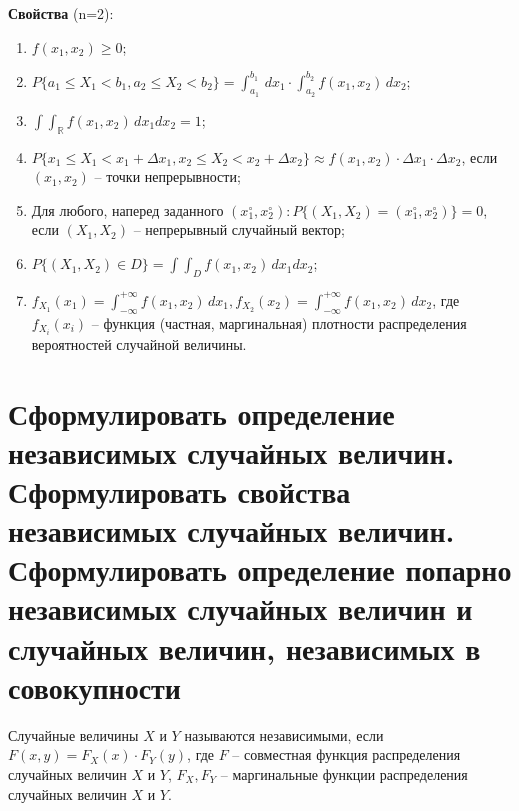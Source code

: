 \textbf{Свойства} (n=2):
\begin{enumerate}
	\item $f(x_1, x_2) \geq 0$;
	\item $P\{a_1 \leq X_1 < b_1, a_2 \leq X_2 < b_2\} = \int_{a_1}^{b_1} \, dx_1 \cdot \int_{a_2}^{b_2} f(x_1, x_2)\, dx_2$;
	\item $\int \int_{\mathbb{R}} f(x_1, x_2)\, dx_1dx_2 = 1$;
	\item $P\{x_1 \leq X_1 < x_1 + \Delta x_1, x_2 \leq X_2 < x_2 + \Delta x_2\} \approx f(x_1, x_2) \cdot \Delta x_1 \cdot \Delta x_2$, если $(x_1, x_2)$ -- точки непрерывности;
	\item Для любого, наперед заданного $(x_1^\circ, x_2^\circ): P\{(X_1, X_2) = (x_1^\circ, x_2^\circ)\} = 0$, если $(X_1, X_2)$ -- непрерывный случайный вектор;
	\item $P\{(X_1, X_2) \in D\} = \int \int_D f(x_1, x_2) \, dx_1dx_2$;
	\item $f_{X_1} (x_1) = \int_{- \infty}^{+\infty} f(x_1, x_2) \, dx_1, f_{X_2} (x_2) = \int_{- \infty}^{+\infty} f(x_1, x_2) \, dx_2$, где $f_{X_i}(x_i)$ -- функция (частная, маргинальная) плотности распределения вероятностей случайной величины.
\end{enumerate}


\section{Сформулировать определение независимых случайных величин. Сформулировать свойства независимых случайных величин. Сформулировать определение попарно независимых случайных величин и случайных величин, независимых в совокупности}

Случайные величины $X$ и $Y$ называются независимыми, если $F(x, y) = F_X(x) \cdot F_Y(y)$, где $F$ -- совместная функция распределения случайных величин $X$ и $Y$, $F_X, F_Y$ -- маргинальные функции распределения случайных величин $X$ и $Y$.

